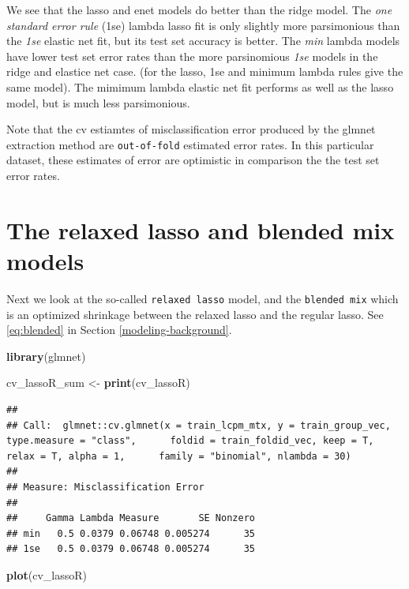 \documentclass[
]{book}
\newenvironment{Shaded}{\begin{snugshade}}{\end{snugshade}}
\newcommand{\KeywordTok}[1]{\textcolor[rgb]{0.13,0.29,0.53}{\textbf{#1}}}
\newcommand{\NormalTok}[1]{#1}
\newcommand{\StringTok}[1]{\textcolor[rgb]{0.31,0.60,0.02}{#1}}
\begin{document}
We see that the lasso and enet models do better than the ridge model.
The \emph{one standard error rule} (1se) lambda lasso fit is only slightly more parsimonious than the
\emph{1se} elastic net fit, but its test set accuracy is better.
The \emph{min} lambda models have lower test set error rates than
the more parsinomious \emph{1se} models in the ridge and elastice net case.
(for the lasso, 1se and minimum lambda rules give the same model).
The mimimum lambda elastic net fit performs as well as the lasso model,
but is much less parsimonious.

Note that the cv estiamtes of misclassification error produced by
the glmnet extraction method are \texttt{out-of-fold} estimated error rates.
In this particular dataset, these estimates of error are
optimistic in comparison the the test set error rates.

\hypertarget{the-relaxed-lasso-and-blended-mix-models}{%
\section{The relaxed lasso and blended mix models}\label{the-relaxed-lasso-and-blended-mix-models}}

Next we look at the so-called \texttt{relaxed\ lasso} model, and
the \texttt{blended\ mix} which is an optimized shrinkage
between the relaxed lasso and the regular lasso.
See \eqref{eq:blended} in Section \ref{modeling-background}.

\begin{Shaded}
\begin{Highlighting}[]
\KeywordTok{library}\NormalTok{(glmnet)}

\NormalTok{cv\_lassoR\_sum <{-}}\StringTok{ }\KeywordTok{print}\NormalTok{(cv\_lassoR)}
\end{Highlighting}
\end{Shaded}

\begin{verbatim}
## 
## Call:  glmnet::cv.glmnet(x = train_lcpm_mtx, y = train_group_vec, type.measure = "class",      foldid = train_foldid_vec, keep = T, relax = T, alpha = 1,      family = "binomial", nlambda = 30) 
## 
## Measure: Misclassification Error 
## 
##     Gamma Lambda Measure       SE Nonzero
## min   0.5 0.0379 0.06748 0.005274      35
## 1se   0.5 0.0379 0.06748 0.005274      35
\end{verbatim}

\begin{Shaded}
\begin{Highlighting}[]
\KeywordTok{plot}\NormalTok{(cv\_lassoR)}
\end{Highlighting}
\end{Shaded}
\end{document}

